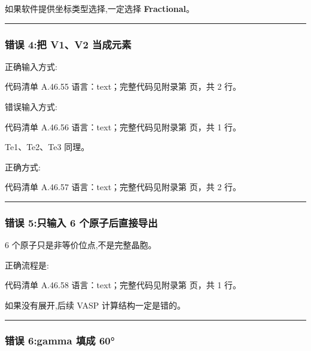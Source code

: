 \documentclass[lang=cn,scheme=chinese,color=blue,device=normal,toc=onecol,math=cm]{elegantbook}
\begin{document}
如果软件提供坐标类型选择,一定选择 \textbf{Fractional}。\par


\medskip\hrule\medskip


\subsubsection{错误 4:把 V1、V2 当成元素}


正确输入方式:\par


\begin{codeindexbox}{代码清单 A.46.55}
语言：text；完整代码见附录第 \pageref{code:46:55} 页，共 2 行。
\end{codeindexbox}


错误输入方式:\par


\begin{codeindexbox}{代码清单 A.46.56}
语言：text；完整代码见附录第 \pageref{code:46:56} 页，共 1 行。
\end{codeindexbox}


Te1、Te2、Te3 同理。\par


正确方式:\par


\begin{codeindexbox}{代码清单 A.46.57}
语言：text；完整代码见附录第 \pageref{code:46:57} 页，共 2 行。
\end{codeindexbox}


\medskip\hrule\medskip


\subsubsection{错误 5:只输入 6 个原子后直接导出}


6 个原子只是非等价位点,不是完整晶胞。\par


正确流程是:\par


\begin{codeindexbox}{代码清单 A.46.58}
语言：text；完整代码见附录第 \pageref{code:46:58} 页，共 1 行。
\end{codeindexbox}


如果没有展开,后续 VASP 计算结构一定是错的。\par


\medskip\hrule\medskip


\subsubsection{错误 6:gamma 填成 60°}
\end{document}

